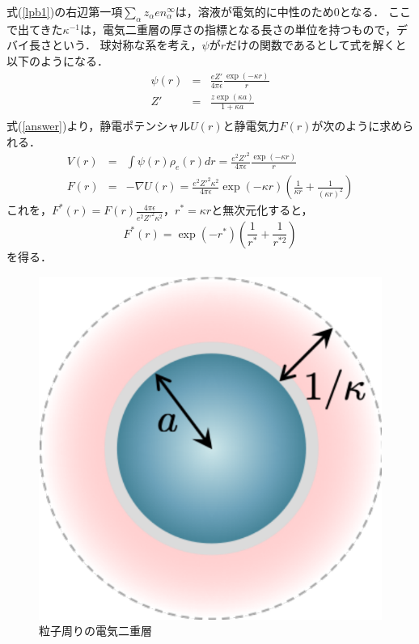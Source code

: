 %
式(\ref{lpb1})の右辺第一項$\sum_\alpha z_\alpha en_\alpha ^\infty$は，溶液が電気的に中性のため0となる．
%
ここで出てきた$\kappa ^{-1}$は，電気二重層の厚さの指標となる長さの単位を持つもので，デバイ長さという．
%
球対称な系を考え，$\psi$が$r$だけの関数であるとして式を解くと以下のようになる．
%
\begin{eqnarray}
\psi (r) &=& \frac{eZ'}{4\pi \epsilon}\frac{\exp (-\kappa r)}{r}\\
\label{answer}
Z' &=& \frac{z\exp (\kappa a)}{1+\kappa a}\\
\end{eqnarray}
%
式(\ref{answer})より，静電ポテンシャル$U(r)$と静電気力$F(r)$が次のように求められる．
%
\begin{eqnarray}
V(r) &=& \int \psi (r)\rho_e (r)dr=\frac{e^2 Z'^2}{4\pi \epsilon}\frac{\exp (-\kappa r)}{r}\\
F(r) &=& -\nabla U(r)=\frac{e^2 Z'^2 \kappa ^2}{4\pi \epsilon}\exp (-\kappa r)(\frac{1}{\kappa r}+\frac{1}{(\kappa r)^2})
\end{eqnarray}
%
これを，$F^* (r)=F(r)\frac{4\pi \epsilon}{e^2 Z'^2 \kappa ^2}$，$r^* =\kappa r$と無次元化すると，
%
\begin{equation}
F^* (r)=\exp (-r^*)(\frac{1}{r^*}+\frac{1}{r^{*2}})
\end{equation}
%
を得る．
\begin{figure}[H]
\centering
\includegraphics[scale = 0.7]{figures/ka.pdf}
\caption{粒子周りの電気二重層}
\label{ka}
\end{figure}
\noindent
